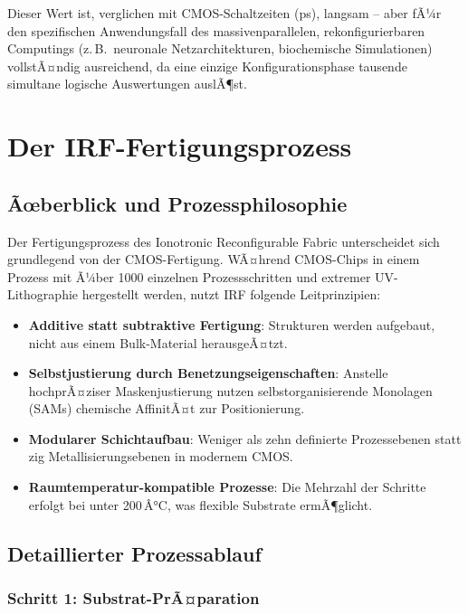 ﻿\documentclass[a4paper,12pt]{scrreprt}
\theoremstyle{definition}
\begin{document}
Dieser Wert ist, verglichen mit CMOS-Schaltzeiten (ps), langsam -- aber fÃ¼r
den spezifischen Anwendungsfall des massivenparallelen, rekonfigurierbaren
Computings (z.\,B.\ neuronale Netzarchitekturen, biochemische Simulationen)
vollstÃ¤ndig ausreichend, da eine einzige Konfigurationsphase tausende
simultane logische Auswertungen auslÃ¶st.

\section{Der IRF-Fertigungsprozess}

\subsection{Ãœberblick und Prozessphilosophie}

Der Fertigungsprozess des Ionotronic Reconfigurable Fabric unterscheidet
sich grundlegend von der CMOS-Fertigung. WÃ¤hrend CMOS-Chips in einem
Prozess mit Ã¼ber 1000 einzelnen Prozessschritten und extremer UV-Lithographie
hergestellt werden, nutzt IRF folgende Leitprinzipien:

\begin{itemize}
	\item \textbf{Additive statt subtraktive Fertigung}: Strukturen werden
	aufgebaut, nicht aus einem Bulk-Material herausgeÃ¤tzt.
	\item \textbf{Selbstjustierung durch Benetzungseigenschaften}: Anstelle
	hochprÃ¤ziser Maskenjustierung nutzen selbstorganisierende Monolagen
	(SAMs) chemische AffinitÃ¤t zur Positionierung.
	\item \textbf{Modularer Schichtaufbau}: Weniger als zehn definierte
	Prozessebenen statt zig Metallisierungsebenen in modernem CMOS.
	\item \textbf{Raumtemperatur-kompatible Prozesse}: Die Mehrzahl der
	Schritte erfolgt bei unter 200\,Â°C, was flexible Substrate ermÃ¶glicht.
\end{itemize}

\subsection{Detaillierter Prozessablauf}

\subsubsection{Schritt 1: Substrat-PrÃ¤paration}
\end{document}
